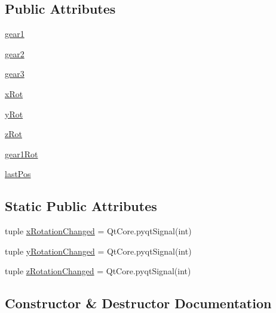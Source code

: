 \subsection*{Public Attributes}
\begin{DoxyCompactItemize}
\item 
\hyperlink{classgrabber_1_1GLWidget_a73c9d4c569eb2d65ab84276ff2cf0ae1}{gear1}
\item 
\hyperlink{classgrabber_1_1GLWidget_ae84bb09d40298400b8878f36a202c867}{gear2}
\item 
\hyperlink{classgrabber_1_1GLWidget_a80c15bfc1a8263a6a8d091cf240b2d11}{gear3}
\item 
\hyperlink{classgrabber_1_1GLWidget_a22da7dfed3616c012f6468a58bf0576e}{x\+Rot}
\item 
\hyperlink{classgrabber_1_1GLWidget_a72497f5a94922bb55d888adcd88292b5}{y\+Rot}
\item 
\hyperlink{classgrabber_1_1GLWidget_a3b2413727ee90b43ebb1f7d69264f94e}{z\+Rot}
\item 
\hyperlink{classgrabber_1_1GLWidget_a24f3fd08826c8fcc32222aef727b3eb3}{gear1\+Rot}
\item 
\hyperlink{classgrabber_1_1GLWidget_a856ed7d7a1b56f6a15f7ac6aa9194d2e}{last\+Pos}
\end{DoxyCompactItemize}
\subsection*{Static Public Attributes}
\begin{DoxyCompactItemize}
\item 
tuple \hyperlink{classgrabber_1_1GLWidget_a6f1a21141e1d483ec9fe97702c0a5485}{x\+Rotation\+Changed} = Qt\+Core.\+pyqt\+Signal(int)
\item 
tuple \hyperlink{classgrabber_1_1GLWidget_abf434462e4dc2896dd24ad7bede6e1d0}{y\+Rotation\+Changed} = Qt\+Core.\+pyqt\+Signal(int)
\item 
tuple \hyperlink{classgrabber_1_1GLWidget_a088516aaf3ffc3e9f19d23443f8d3a30}{z\+Rotation\+Changed} = Qt\+Core.\+pyqt\+Signal(int)
\end{DoxyCompactItemize}


\subsection{Constructor \& Destructor Documentation}
\hypertarget{classgrabber_1_1GLWidget_ae1ca4eadb9a688367563ef12e9a448ea}{}
